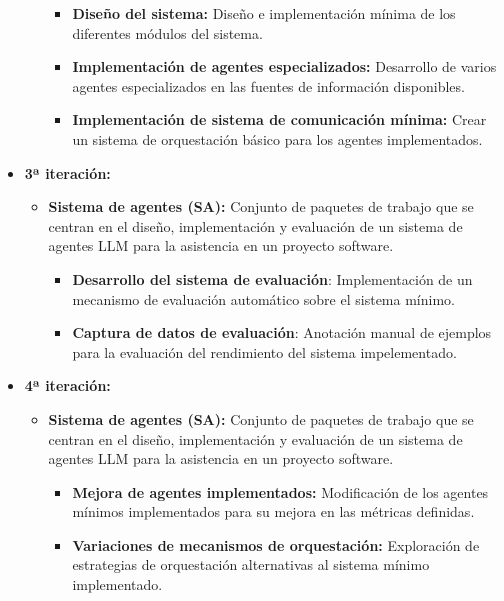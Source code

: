 \begin{itemize}
\begin{itemize}
        \begin{itemize}
          \item\textbf{Diseño del sistema: }Diseño e implementación mínima de los diferentes módulos del sistema. 
        \end{itemize}
        \begin{itemize}
          \item\textbf{Implementación de agentes especializados: }Desarrollo de varios agentes especializados en las fuentes de información disponibles. 
        \end{itemize}
        \begin{itemize}
          \item\textbf{Implementación de sistema de comunicación mínima: }Crear un sistema de orquestación básico para los agentes implementados.         
        \end{itemize}
    \end{itemize}
  \item\textbf{3ª iteración:}
    \begin{itemize}
      \item\textbf{Sistema de agentes (SA): }Conjunto de paquetes de trabajo que se centran en el diseño, implementación y evaluación de un sistema de agentes LLM para la asistencia en un proyecto software.
        \begin{itemize}
          \item\textbf{Desarrollo del sistema de evaluación}: Implementación de un mecanismo de evaluación automático sobre el sistema mínimo.
          \item\textbf{Captura de datos de evaluación}: Anotación manual de ejemplos para la evaluación del rendimiento del sistema impelementado. 
        \end{itemize}
    \end{itemize}
  \item\textbf{4ª iteración:}
    \begin{itemize}
      \item\textbf{Sistema de agentes (SA): }Conjunto de paquetes de trabajo que se centran en el diseño, implementación y evaluación de un sistema de agentes LLM para la asistencia en un proyecto software.
        \begin{itemize}
          \item\textbf{Mejora de agentes implementados: }Modificación de los agentes mínimos implementados para su mejora en las métricas definidas.
          \item\textbf{Variaciones de mecanismos de orquestación: }Exploración de estrategias de orquestación alternativas al sistema mínimo implementado. 

\end{itemize}
\end{itemize}
\end{itemize}
